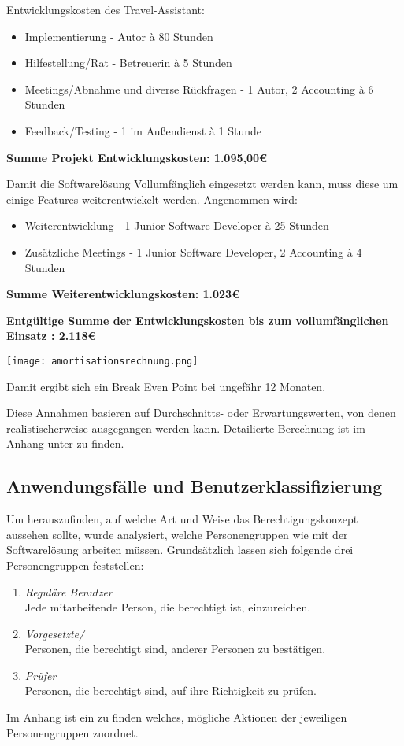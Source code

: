 Entwicklungskosten des Travel-Assistant:
\begin{itemize}

\item Implementierung - Autor à 80 Stunden
\item Hilfestellung/Rat - Betreuerin à 5 Stunden 
\item Meetings/Abnahme und diverse Rückfragen - 1 Autor, 2  Accounting à 6 Stunden
\item Feedback/Testing - 1  im Außendienst à 1 Stunde
\end{itemize}

\textbf{Summe Projekt Entwicklungskosten: 1.095,00€}

Damit die Softwarelösung Vollumfänglich eingesetzt werden kann, muss diese um einige Features weiterentwickelt werden. Angenommen wird:
\begin{itemize}
\item Weiterentwicklung - 1 Junior Software Developer à 25 Stunden
\item Zusätzliche Meetings - 1 Junior Software Developer, 2  Accounting à 4 Stunden
\end{itemize}

\textbf{Summe Weiterentwicklungskosten: 1.023€}

\textbf{Entgültige Summe der Entwicklungskosten bis zum vollumfänglichen Einsatz : 2.118€}

\texttt{[image: amortisationsrechnung.png]}

Damit ergibt sich ein Break Even Point bei ungefähr 12 Monaten.

Diese Annahmen basieren auf Durchschnitts- oder Erwartungswerten, von denen realistischerweise ausgegangen werden kann.
Detailierte Berechnung ist im Anhang unter  zu finden.

\subsection{Anwendungsfälle und Benutzerklassifizierung}
\label{sec:Analysephase:Benutzerklassifizierung}

Um herauszufinden, auf welche Art und Weise das Berechtigungskonzept aussehen sollte, wurde analysiert, welche Personengruppen wie mit der Softwarelösung arbeiten müssen.
Grundsätzlich lassen sich folgende drei Personengruppen feststellen:

\begin{enumerate}
    \item \emph{Reguläre Benutzer}\\
    Jede mitarbeitende Person, die berechtigt ist,  einzureichen.
    \item \emph{Vorgesetzte/}\\
    Personen, die berechtigt sind,  anderer Personen zu bestätigen.
    \item \emph{Prüfer}\\
    Personen, die berechtigt sind,  auf ihre Richtigkeit zu prüfen.
\end{enumerate}

Im Anhang ist ein  zu finden welches, mögliche Aktionen der jeweiligen Personengruppen zuordnet.